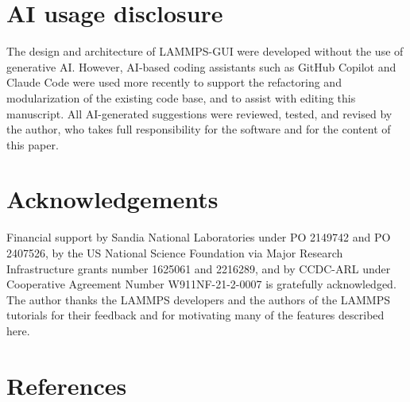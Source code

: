 \documentclass[
]{article}
\begin{document}
\section{AI usage disclosure}\label{ai-usage-disclosure}

The design and architecture of LAMMPS-GUI were developed without the use
of generative AI. However, AI-based coding assistants such as GitHub
Copilot and Claude Code were used more recently to support the
refactoring and modularization of the existing code base, and to assist
with editing this manuscript. All AI-generated suggestions were
reviewed, tested, and revised by the author, who takes full
responsibility for the software and for the content of this paper.

\section{Acknowledgements}\label{acknowledgements}

Financial support by Sandia National Laboratories under PO 2149742 and
PO 2407526, by the US National Science Foundation via Major Research
Infrastructure grants number 1625061 and 2216289, and by CCDC-ARL under
Cooperative Agreement Number W911NF-21-2-0007 is gratefully
acknowledged. The author thanks the LAMMPS developers and the authors of
the LAMMPS tutorials for their feedback and for motivating many of the
features described here.

\section*{References}\label{references}
\end{document}
